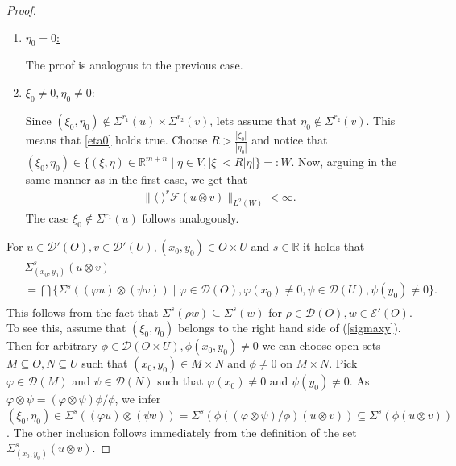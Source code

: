 \documentclass{amsart}
\theoremstyle{definition}
\begin{document}
\begin{proof}
\begin{enumerate}
\begin{align*}
\lVert \langle \cdot \rangle^{r} \mathcal{F} (u\otimes v) \rVert_{L^2 (W)} ^2
&\leq c^2 \iint_{\substack{ \eta\in V \\ |\xi|<|\eta| }} \langle \eta \rangle^{2r_2} \langle \xi \rangle^{2r'} |\mathcal{F}u (\xi)|^2 |\mathcal{F}v (\eta)|^2 \mathrm{d}\xi \mathrm{d}\eta\\
&\leq c^2\int_{\xi\in\mathbb{R}^m} \langle \xi \rangle^{2r'} |\mathcal{F}u (\xi)|^2 \mathrm{d}\xi \int_{\eta\in V } \langle \eta \rangle^{2r_2} |\mathcal{F}v (\eta)|^2 \mathrm{d}\eta
< \infty,
\end{align*}
since $u\in H_{loc}  ^{r'} (O)$ and has a compact support.

\item \underline{$\eta_0 = 0$:}

The proof is analogous to the previous case.

\item \underline{$\xi_0\neq0 , \eta_0\neq 0 $:}

Since $(\xi_0, \eta_0)\notin \Sigma^{r_1} (u) \times \Sigma^{r_2} (v)$, lets assume that $\eta_0 \notin \Sigma^{r_2} (v)$. This means that \eqref{eta0} holds true. Choose $R>\frac{|\xi_0|}{|\eta_0|}$ and notice that $(\xi_0 , \eta_0) \in \{ (\xi , \eta)\in \mathbb{R}^{m+n} \mid \eta\in V , |\xi| < R |\eta | \} =: W$. Now, arguing in the same manner as in the first case, we get that
\begin{align*}
\lVert \langle \cdot\rangle^{r} \mathcal{F} (u\otimes v) \rVert_{L^2 (W)} < \infty.
\end{align*}
The case $\xi_0 \notin \Sigma^{r_1} (u)$ follows analogously.
\end{enumerate}
For $u\in \mathcal{D}' (O), v\in \mathcal{D}' (U), (x_0 , y_0) \in O\times U$ and $s\in\mathbb{R}$ it holds that
\begin{align}
\label{sigmaxy}
\begin{split}
&\Sigma_{(x_0 , y_0)} ^s (u\otimes v)\\
&= \bigcap \{ \Sigma^s ( (\varphi u) \otimes (\psi v) ) \mid \varphi \in \mathcal{D} (O) , \varphi (x_0) \neq 0 , \psi\in\mathcal{D} (U) , \psi (y_0) \neq 0\}.
\end{split}
\end{align}
This follows from the fact that $\Sigma^s (\rho w) \subseteq \Sigma^s (w)$ for $\rho \in \mathcal{D} (O) , w \in \mathcal{E}' (O)$. To see this, assume that $(\xi_0 , \eta_0)$ belongs to the right hand side of (\ref{sigmaxy}). Then for arbitrary $\phi\in\mathcal{D} (O\times U) , \phi (x_0 , y_0) \neq 0$ we can choose open sets $M\subseteq O , N\subseteq U$ such that $(x_0,y_0)\in M\times N$ and $\phi \neq 0$ on $M\times N$. Pick $\varphi\in \mathcal{D} (M)$ and $\psi\in\mathcal{D}(N)$ such that $\varphi (x_0) \neq 0$ and $\psi (y_0) \neq 0$. As $\varphi \otimes \psi = (\varphi \otimes \psi)\phi/\phi$, we infer $(\xi_0 , \eta_0) \in \Sigma^s ((\varphi u) \otimes (\psi v)) = \Sigma^s (\phi ((\varphi \otimes \psi)/\phi) (u\otimes v)) \subseteq \Sigma^s (\phi (u\otimes v)) $. The other inclusion follows immediately from the definition of the set $\Sigma_{(x_0 , y_0)} ^s (u\otimes v)$.


\end{proof}
\end{document}
